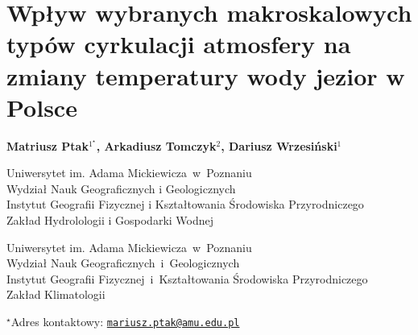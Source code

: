 \documentclass[\main/boa.tex]{subfiles}
\begin{document}
\section{Wpływ wybranych makroskalowych typów cyrkulacji atmosfery na zmiany temperatury wody jezior w Polsce}

\begin{center}
  {\bf {} Matriusz Ptak$^{1^\star}$,   Arkadiusz Tomczyk$^{2}$,  Dariusz Wrzesiński$^{1}$ }
\end{center}

\vskip 0.3cm

\begin{affiliations}
\begin{enumerate}
\begin{minipage}{0.915\textwidth}
\centering
\item Uniwersytet im. Adama Mickiewicza~w~Poznaniu\\ Wydział Nauk Geograficznych i Geologicznych\\ Instytut Geografii Fizycznej i Kształtowania Środowiska Przyrodniczego \\Zakład Hydrolologii i Gospodarki Wodnej
\item Uniwersytet im. Adama Mickiewicza~w~Poznaniu \\ Wydział Nauk Geograficznych~i~Geologicznych  \\ Instytut Geografii Fizycznej~i~Kształtowania Środowiska Przyrodniczego\\
Zakład Klimatologii \\[-2pt]
\end{minipage}
\end{enumerate}
$^\star$Adres kontaktowy: \href{mailto:mariusz.ptak@amu.edu.pl}{\nolinkurl{mariusz.ptak@amu.edu.pl}}\\
\end{affiliations}

\vskip 0.5cm


\vskip 0.5cm
\end{document}
